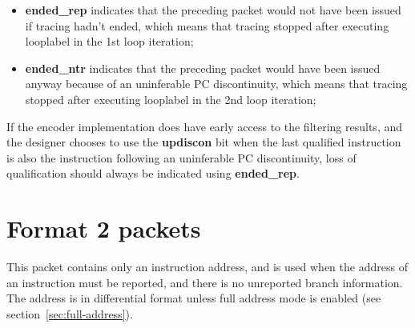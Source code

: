 \begin{itemize}
  \item \textbf{ended\_rep} indicates that the preceding packet would not have been issued if tracing hadn't ended, 
    which means that tracing stopped after executing looplabel in the 1st loop iteration;
  \item \textbf{ended\_ntr} indicates that the preceding packet would have been issued anyway because of an uninferable
    PC discontinuity, which means that tracing stopped after executing looplabel in the 2nd loop iteration;
\end{itemize}

If the encoder implementation does have early access to the filtering results, and the designer chooses to use the
\textbf{updiscon} bit when the last qualified instruction is also the instruction following an uninferable PC discontinuity,
loss of qualification should always be indicated using \textbf{ended\_rep}.

\FloatBarrier
\section{Format 2 packets} \label{sec:format2}

This packet contains only an instruction address, and is used when the address of an instruction must be reported, 
and there is no unreported branch information.  The address is in differential format unless full address mode is
enabled (see section~\ref{sec:full-address}).


